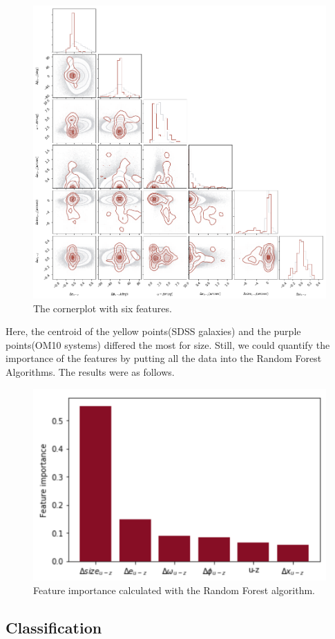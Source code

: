 \documentclass[\docopts]{\docclass}
\begin{document}
\begin{figure}
\includegraphics[width=0.9\columnwidth]{cornerplot.png}
\caption{The cornerplot with six features.}
 \label{fig:cornerplot}
\end{figure}

Here, the centroid of the yellow points(SDSS galaxies) and the purple
points(OM10 systems) differed the most for size. Still, we could
quantify the importance of the features by putting all the data into the
Random Forest Algorithms. The results were as follows.

\begin{figure}[!h]
\includegraphics[width=0.4\columnwidth]{FeatureImportance.png}
\caption{Feature importance calculated with the Random Forest algorithm.}
 \label{fig:featureimportance}
\end{figure}

\subsection{Classification}
\label{subsec:classification_data}
\end{document}
